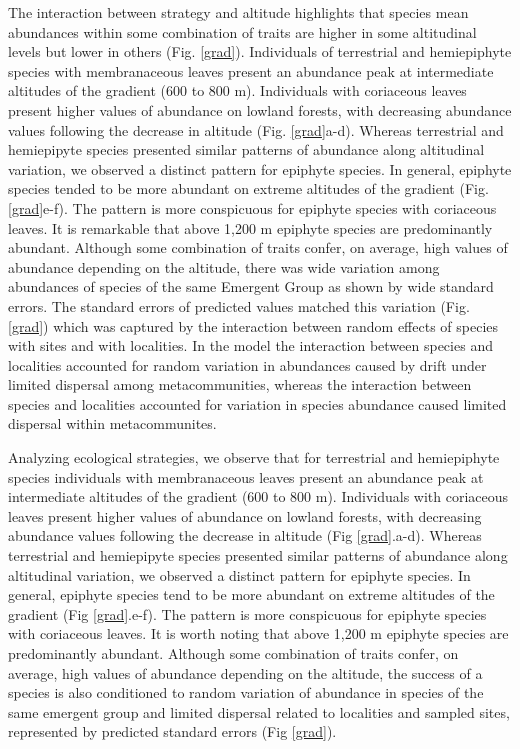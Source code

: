 \documentclass[12pt]{article}
\begin{document}
The interaction between strategy and altitude highlights that species
mean abundances within some combination of traits are higher in some
altitudinal levels but lower in others (Fig. \ref{grad}). 
Individuals of terrestrial and hemiepiphyte species with
membranaceous leaves present an abundance peak at intermediate
altitudes of the gradient (600 to 800 m). Individuals with coriaceous
leaves present higher values of abundance on  lowland forests, with
decreasing abundance values following the decrease in altitude (Fig.
\ref{grad}a-d). Whereas terrestrial and hemiepipyte species presented
similar patterns of abundance along altitudinal variation, we observed
a distinct pattern for epiphyte species. In general, epiphyte species
tended to be more abundant on extreme altitudes of the gradient (Fig.
\ref{grad}e-f). The pattern is more conspicuous for epiphyte species
with coriaceous leaves. It is remarkable that above 1,200 m epiphyte
species are predominantly abundant.
Although some combination of traits confer, on average, high values of abundance depending on the altitude, 
there was wide variation among abundances of species of the same Emergent Group as shown by wide
standard errors. The standard errors of predicted values matched %
this
variation (Fig. \ref{grad}) which was captured by the interaction between random
effects of species with sites and with localities. In the model the interaction between species and localities accounted for random variation in abundances caused by drift under limited dispersal among metacommunities, whereas the interaction between species and localities accounted for variation in species abundance caused limited dispersal within metacommunites. 

Analyzing ecological strategies, we observe that for terrestrial and hemiepiphyte species individuals with membranaceous leaves present an abundance peak at intermediate altitudes of the gradient (600 to 800 m). Individuals with coriaceous leaves present higher values of abundance on  lowland forests, with decreasing abundance values following the decrease in altitude (Fig \ref{grad}.a-d). Whereas terrestrial and hemiepipyte species presented similar patterns of abundance along altitudinal variation, we observed a distinct pattern for epiphyte species. In general, epiphyte species tend to be more abundant on extreme altitudes of the gradient (Fig \ref{grad}.e-f). The pattern is more conspicuous for epiphyte species with coriaceous leaves. It is worth noting that above 1,200 m epiphyte species are predominantly abundant.   %
Although some combination of traits confer, on average, high values of abundance depending on the altitude, 
the success of a species is also conditioned to random variation of abundance in species of the same emergent group and 
limited dispersal related to localities and sampled sites, represented by predicted standard errors (Fig \ref{grad}).
\end{document}
